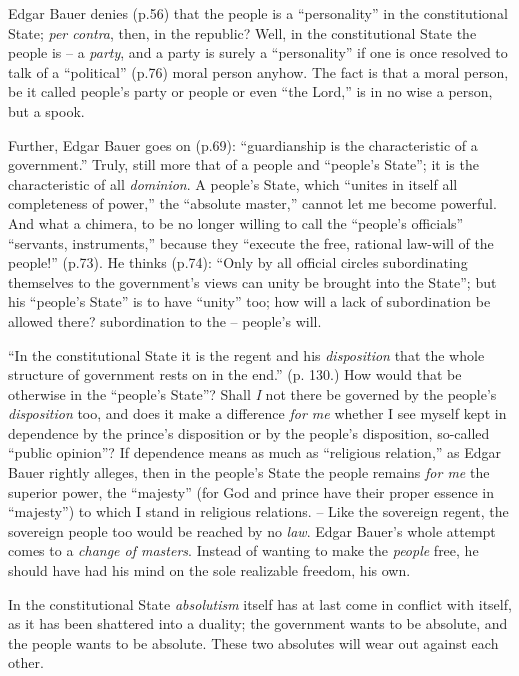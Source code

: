 Edgar Bauer denies (p.56) that the people is a ``personality'' in the 
constitutional State; \textit{per contra}, then, in the republic? Well, in the 
constitutional State the people is -- a \textit{party}, and a party is surely 
a ``personality'' if one is once resolved to talk of a ``political'' 
(p.76) moral person anyhow. The fact is that a moral person, be it called 
people's party or people or even ``the Lord,'' is in no wise a person, but a 
spook.

Further, Edgar Bauer goes on (p.69): ``guardianship is the characteristic of 
a government.'' Truly, still more that of a people and ``people's State''; 
it is the characteristic of all \textit{dominion}. A people's State, which 
``unites in itself all completeness of power,'' the ``absolute master,'' 
cannot let me become powerful. And what a chimera, to be no longer willing to 
call the ``people's officials'' ``servants, instruments,'' because they 
``execute the free, rational law-will of the people!'' (p.73). He thinks 
(p.74): ``Only by all official circles subordinating themselves to the 
government's views can unity be brought into the State''; but his ``people's 
State'' is to have ``unity'' too; how will a lack of subordination be 
allowed there? subordination to the -- people's will.

``In the constitutional State it is the regent and his \textit{disposition} 
that the whole structure of government rests on in the end.'' (p. 130.) How 
would that be otherwise in the ``people's State''? Shall \textit{I} not 
there be governed by the people's \textit{disposition} too, and does it make a 
difference \textit{for me} whether I see myself kept in dependence by the 
prince's disposition or by the people's disposition, so-called ``public 
opinion''? If dependence means as much as ``religious relation,'' as Edgar 
Bauer rightly alleges, then in the people's State the people remains 
\textit{for me} the superior power, the ``majesty'' (for God and prince have 
their proper essence in ``majesty'') to which I stand in religious 
relations. -- Like the sovereign regent, the sovereign people too would be 
reached by no \textit{law}. Edgar Bauer's whole attempt comes to a 
\textit{change of masters}. Instead of wanting to make the \textit{people} 
free, he should have had his mind on the sole realizable freedom, his own.

In the constitutional State \textit{absolutism} itself has at last come in 
conflict with itself, as it has been shattered into a duality; the government 
wants to be absolute, and the people wants to be absolute. These two absolutes 
will wear out against each other.

